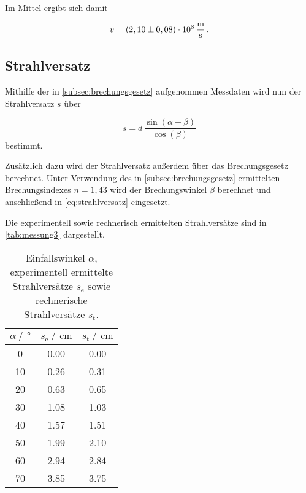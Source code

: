 Im Mittel ergibt sich damit

\begin{equation*}
    v = (2,10 \pm 0,08) \cdot 10^8 \,\unit{\frac{\meter}{\second}} \,.
\end{equation*} 


\subsection{Strahlversatz}

Mithilfe der in \autoref{subsec:brechungsgesetz} aufgenommen Messdaten wird nun der Strahlversatz $s$ über 

\begin{equation}
    s = d \,\frac{\sin(\alpha - \beta)}{\cos(\beta)}
    \label{eq:strahlversatz}
\end{equation}
bestimmt.

Zusätzlich dazu wird der Strahlversatz außerdem über das Brechungsgesetz berechnet.
Unter Verwendung des in \autoref{subsec:brechungsgesetz} ermittelten Brechungsindexes $n = 1,43$ wird der Brechungswinkel $\beta$ berechnet und anschließend in \eqref{eq:strahlversatz} eingesetzt.

Die experimentell sowie rechnerisch ermittelten Strahlversätze sind in \autoref{tab:messung3} dargestellt.

\begin{table}[H]
    \centering
    \caption{Einfallswinkel $\alpha$, experimentell ermittelte Strahlversätze $s_{\text{e}}$ sowie rechnerische Strahlversätze $s_{\text{t}}$.}
    \label{tab:messung3}
    \begin{tabular}{S[table-format=2.0] S[table-format=1.2] S[table-format=1.2]}
      \toprule
        {$\alpha \mathbin{/} \, \unit{\degree}$} & {$ s_{\text{e}} \mathbin{/} \, \unit{\centi\meter}$} & {$ s_{\text{t}} \mathbin{/} \, \unit{\centi\meter}$} \\
                &       0.00     &   0.00  \\
      10          &       0.26     &   0.31  \\
      20          &       0.63     &   0.65  \\
      30          &       1.08     &   1.03  \\
      40          &       1.57     &   1.51  \\
      50          &       1.99     &   2.10  \\
      60          &       2.94     &   2.84  \\
      70          &       3.85     &   3.75  \\
    \bottomrule
    \end{tabular}
\end{table}

